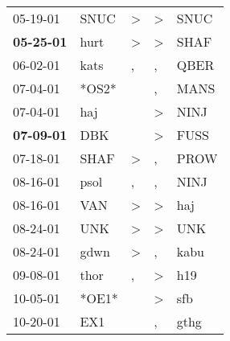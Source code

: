 \begin{supertabular}{p{0.07\textwidth}p{0.06\textwidth}p{0.02\textwidth}p{0.02\textwidth}p{0.06\textwidth}}
          05-19-01\textsuperscript{} &           SNUC\textsuperscript{} &     \textgreater &     \textgreater &           SNUC\textsuperscript{} \\
 \textbf{05-25-01\textsuperscript{}} &           hurt\textsuperscript{} &     \textgreater &     \textgreater &           SHAF\textsuperscript{} \\
          06-02-01\textsuperscript{} &           kats\textsuperscript{} &                , &                , &           QBER\textsuperscript{} \\
          07-04-01\textsuperscript{} &                            *OS2* &                  &                , &           MANS\textsuperscript{} \\
          07-04-01\textsuperscript{} &            haj\textsuperscript{} &                  &     \textgreater &           NINJ\textsuperscript{} \\
 \textbf{07-09-01\textsuperscript{}} &            DBK\textsuperscript{} &                  &     \textgreater &           FUSS\textsuperscript{} \\
          07-18-01\textsuperscript{} &           SHAF\textsuperscript{} &     \textgreater &                , &           PROW\textsuperscript{} \\
          08-16-01\textsuperscript{} &           psol\textsuperscript{} &                , &                , &           NINJ\textsuperscript{} \\
          08-16-01\textsuperscript{} &            VAN\textsuperscript{} &     \textgreater &     \textgreater &            haj\textsuperscript{} \\
          08-24-01\textsuperscript{} &            UNK\textsuperscript{} &     \textgreater &     \textgreater &            UNK\textsuperscript{} \\
          08-24-01\textsuperscript{} &           gdwn\textsuperscript{} &     \textgreater &                , &           kabu\textsuperscript{} \\
          09-08-01\textsuperscript{} &           thor\textsuperscript{} &                , &     \textgreater &            h19\textsuperscript{} \\
          10-05-01\textsuperscript{} &                            *OE1* &                  &     \textgreater &            sfb\textsuperscript{} \\
          10-20-01\textsuperscript{} &            EX1\textsuperscript{} &                  &                , &           gthg\textsuperscript{} \\

\end{supertabular}

